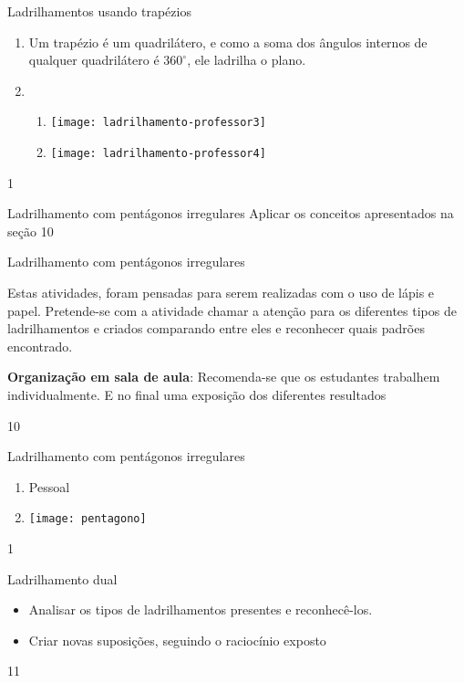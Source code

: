 \begin{answer}{Ladrilhamentos usando trapézios}
{
	\begin{enumerate}
	\item Um trapézio é um quadrilátero, e como a soma dos ângulos internos de qualquer quadrilátero é $360^{\circ}$, ele ladrilha o plano.
	\item
	\begin{enumerate}
	\item 
	{
	\texttt{[image: ladrilhamento-professor3]}
	}

	\item
	{	
	\texttt{[image: ladrilhamento-professor4]}
	}
	\end{enumerate}
	\end{enumerate}
}{1}
\end{answer}
\clearmargin
\begin{objectives}{Ladrilhamento com pentágonos irregulares}
{
	Aplicar os conceitos apresentados na seção
}{1}{0}
\end{objectives}
\begin{sugestions}{Ladrilhamento com pentágonos irregulares}
{
	Estas atividades, foram pensadas para serem realizadas com o uso de lápis e papel. Pretende-se com a atividade chamar a atenção para os diferentes tipos de ladrilhamentos e criados comparando entre eles e reconhecer quais padrões encontrado. 

	\textbf{Organização em sala de aula}: Recomenda-se que os estudantes trabalhem individualmente. E no final uma exposição dos diferentes resultados

}{1}{0}
\end{sugestions}
\begin{answer}{Ladrilhamento com pentágonos irregulares}
{
\begin{enumerate}
\item Pessoal
\item {}
{
\texttt{[image: pentagono]}
}
\end{enumerate}
}
{1}
\end{answer}
\clearmargin
\begin{objectives}{Ladrilhamento dual}
{
	\begin{itemize}
	\item Analisar os tipos de ladrilhamentos presentes e reconhecê-los.
	\item Criar novas suposições, seguindo o raciocínio exposto
	\end{itemize}
}{1}{1}
\end{objectives}
